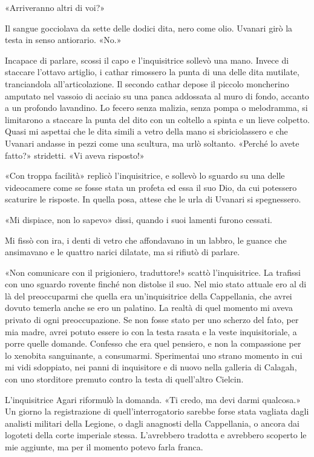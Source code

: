 «Arriveranno altri di voi?»

Il sangue gocciolava da sette delle dodici dita, nero come olio. Uvanari
girò la testa in senso antiorario. «No.»

Incapace di parlare, scossi il capo e l'inquisitrice sollevò una mano.
Invece di staccare l'ottavo artiglio, i cathar rimossero la punta di una
delle dita mutilate, tranciandola all'articolazione. Il secondo cathar
depose il piccolo moncherino amputato nel vassoio di acciaio su una
panca addossata al muro di fondo, accanto a un profondo lavandino. Lo
fecero senza malizia, senza pompa o melodramma, si limitarono a staccare
la punta del dito con un coltello a spinta e un lieve colpetto. Quasi mi
aspettai che le dita simili a vetro della mano si sbriciolassero e che
Uvanari andasse in pezzi come una scultura, ma urlò soltanto. «Perché lo
avete fatto?» stridetti. «Vi aveva risposto!»

«Con troppa facilità» replicò l'inquisitrice, e sollevò lo sguardo su
una delle videocamere come se fosse stata un profeta ed essa il suo Dio,
da cui potessero scaturire le risposte. In quella posa, attese che le
urla di Uvanari si spegnessero.

«Mi dispiace, non lo sapevo» dissi, quando i suoi lamenti furono
cessati.

Mi fissò con ira, i denti di vetro che affondavano in un labbro, le
guance che ansimavano e le quattro narici dilatate, ma si rifiutò di
parlare.

«Non comunicare con il prigioniero, traduttore!» scattò l'inquisitrice.
La trafissi con uno sguardo rovente finché non distolse il suo. Nel mio
stato attuale ero al di là del preoccuparmi che quella era
un'inquisitrice della Cappellania, che avrei dovuto temerla anche se ero
un palatino. La realtà di quel momento mi aveva privato di ogni
preoccupazione. Se non fosse stato per uno scherzo del fato, per mia
madre, avrei potuto essere io con la testa rasata e la veste
inquisitoriale, a porre quelle domande. Confesso che era quel pensiero,
e non la compassione per lo xenobita sanguinante, a consumarmi.
Sperimentai uno strano momento in cui mi vidi sdoppiato, nei panni di
inquisitore e di nuovo nella galleria di Calagah, con uno storditore
premuto contro la testa di quell'altro Cielcin.

L'inquisitrice Agari riformulò la domanda. «Ti credo, ma devi darmi
qualcosa.» Un giorno la registrazione di quell'interrogatorio sarebbe
forse stata vagliata dagli analisti militari della Legione, o dagli
anagnosti della Cappellania, o ancora dai logoteti della corte imperiale
stessa. L'avrebbero tradotta e avrebbero scoperto le mie aggiunte, ma
per il momento potevo farla franca.


